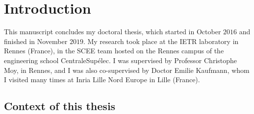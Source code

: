 
\chapter{Introduction}
\label{chapter:1}




\graphicspath{{2-Chapters/1-Chapter/Images/}}

%
This manuscript concludes my doctoral thesis, which started in October $2016$ and finished in November $2019$.
My research took place at the IETR laboratory in Rennes (France), in the SCEE team hosted on the Rennes campus of the engineering school CentraleSupélec.
I was supervised by Professor Christophe Moy, in Rennes,
and I was also co-supervised by Doctor Emilie Kaufmann, whom I visited many times at Inria Lille Nord Europe in Lille (France).


\section{Context of this thesis}
\label{sec:1:problems}

